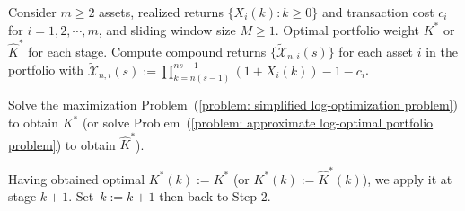 \documentclass[10pt]{article} %
\begin{document}
	
	\begin{algorithm}
		\caption{Online Trading via Sliding Window Approach}
		\begin{algorithmic}[1]
			\Require Consider $m \geq 2$ assets, realized returns $\{ X_i(k): k \geq 0\}$ and transaction cost $c_i$ for $i=1,2,\cdots,m$, and sliding window size $M \geq 1.$
			\Ensure Optimal portfolio weight $K^*$ or $\widehat{K}^*$ for each stage.
			\State Compute compound returns $\{ \widetilde{\mathcal{X}}_{n,i}(s) \}$ for each asset $i$ in the portfolio with $\widetilde{\mathcal{X}}_{n,i}(s) := \prod_{k=n(s-1)}^{ns-1}(1+X_i(k))-1-c_i$.
			
			
			\State Solve the maximization Problem~(\ref{problem: simplified log-optimization problem}) to obtain $K^*$ (or solve Problem~(\ref{problem: approximate log-optimal portfolio problem}) to obtain $\widehat{K}^*$).
			
			\State Having obtained optimal $K^*(k):= K^*$ (or $K^*(k):=\widehat{K}^*(k)$), we apply it at stage $k+1$. Set~$k:=k+1$ then back to Step $2$.
			\EndIf
		\end{algorithmic}
		\label{algorithm: sliding window approach for log-optimum}
	\end{algorithm}
	
\end{document}
